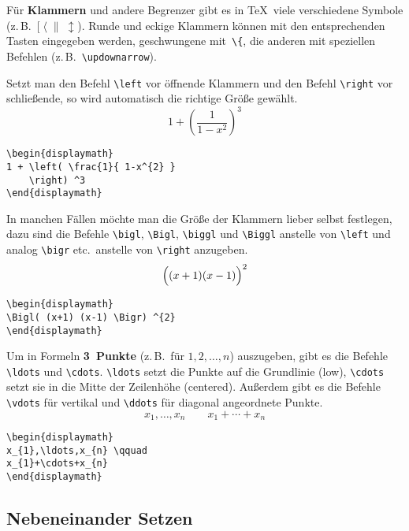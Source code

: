 Für \textbf{Klammern} und andere Begrenzer gibt es in \TeX\ 
viele verschiedene Symbole
(z.\,B.~\([\;\langle\;\|\;\updownarrow\)).
Runde und eckige Klammern können mit den entsprechenden Tasten
eingegeben werden, geschwungene mit~\verb|\{|, die anderen mit
speziellen Befehlen (z.\,B.~\verb|\updownarrow|).
 
Setzt man den Befehl \verb|\left| vor öffnende Klammern und den
Befehl \verb|\right| vor schließende, so wird automatisch die
richtige Größe gewählt.
\exa
\begin{displaymath}
1 + \left( \frac{1}{ 1-x^{2} }
    \right) ^3
\end{displaymath}
\exb
\begin{verbatim}
\begin{displaymath}
1 + \left( \frac{1}{ 1-x^{2} }
    \right) ^3
\end{displaymath}
\end{verbatim}
\exc
 
In manchen Fällen möchte man die Größe der Klammern lieber
selbst festlegen, dazu sind die Befehle
\verb|\bigl|,
\verb|\Bigl|,
\verb|\biggl| und
\verb|\Biggl| anstelle von \verb|\left|
und analog \verb|\bigr| etc.\ anstelle von \verb|\right|
anzugeben.
\exa
\begin{displaymath}
\Bigl( (x+1) (x-1) \Bigr) ^{2}
\end{displaymath}
\exb
\begin{verbatim}
\begin{displaymath}
\Bigl( (x+1) (x-1) \Bigr) ^{2}
\end{displaymath}
\end{verbatim}
\exc
 
Um in Formeln \textbf{3~Punkte} (z.\,B.\ für \(1,2,\ldots,n\))
auszugeben, gibt es die Befehle
\verb|\ldots| und \verb|\cdots|.
\verb|\ldots| setzt die Punkte auf die Grundlinie (low),
\verb|\cdots| setzt sie in die Mitte der Zeilenhöhe
(centered).
Außerdem gibt es die Befehle
\verb|\vdots| für vertikal und
\verb|\ddots| für diagonal angeordnete Punkte.
\exa
\begin{displaymath}
x_{1},\ldots,x_{n} \qquad
x_{1}+\cdots+x_{n}
\end{displaymath}
\exb
\begin{verbatim}
\begin{displaymath}
x_{1},\ldots,x_{n} \qquad
x_{1}+\cdots+x_{n}
\end{displaymath}
\end{verbatim}
\exc


\subsection{Nebeneinander Setzen}
 
